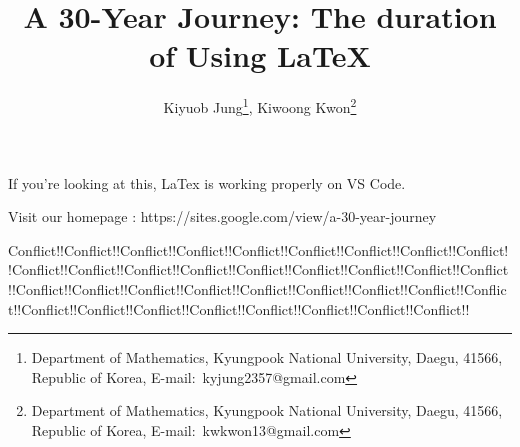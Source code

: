\documentclass[a4paper,11pt]{article}
\title{
    A 30-Year Journey: The duration of Using LaTeX
    }
\author{
    Kiyuob Jung\thanks{Department of Mathematics, Kyungpook National University, Daegu, 41566, Republic of Korea, E-mail:~kyjung2357@gmail.com},
    Kiwoong Kwon\thanks{Department of Mathematics, Kyungpook National University, Daegu, 41566, Republic of Korea, E-mail:~kwkwon13@gmail.com}
    }
\begin{document}
\date{}
\maketitle

If you're looking at this, LaTex is working properly on VS Code.

Visit our homepage : https://sites.google.com/view/a-30-year-journey


Conflict!!Conflict!!Conflict!!Conflict!!Conflict!!Conflict!!Conflict!!Conflict!!Conflict!!Conflict!!Conflict!!Conflict!!Conflict!!Conflict!!Conflict!!Conflict!!Conflict!!Conflict!!Conflict!!Conflict!!Conflict!!Conflict!!Conflict!!Conflict!!Conflict!!Conflict!!Conflict!!Conflict!!Conflict!!Conflict!!Conflict!!Conflict!!Conflict!!Conflict!!Conflict!!
\end{document}
